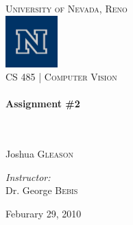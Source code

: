 \begin{titlepage}
\begin{center}

\textsc{\LARGE University of Nevada, Reno}\\[.5cm]
\includegraphics[width=0.15\textwidth]{./logo.png}\\[.5cm]

\textsc{\large CS 485 | Computer Vision } \\[.5cm]

\HRule \\[0.4cm]
{ \huge \bfseries Assignment \#2}\\[0.4cm]

\HRule \\[1.5cm]

\begin{minipage}{0.4\textwidth}
\begin{flushleft} \large
\emph{}\\
    Joshua \textsc{Gleason}\\
    \end{flushleft}
    \end{minipage}
    \begin{minipage}{0.4\textwidth}
    \begin{flushright} \large
    \emph{Instructor:} \\
      Dr. George \textsc{Bebis}
      \end{flushright}
      \end{minipage}

      \vspace*{\fill}

      

      \vspace*{\fill}

{\large Feburary 29, 2010}

\end{center}

\end{titlepage}


